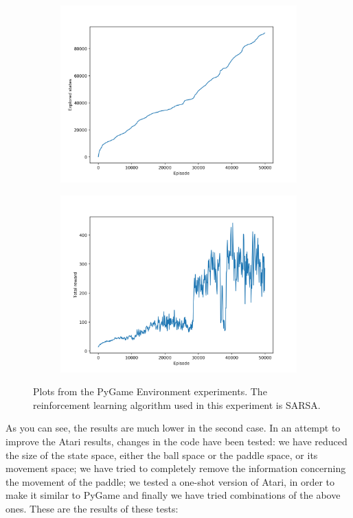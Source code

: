 \begin{figure}
\begin{subfigure}[h]{0.5\linewidth}
\includegraphics[width=\linewidth]{images/pygame-explored-states.png}
\end{subfigure}
\hfill
\begin{subfigure}[h]{0.5\linewidth}
\includegraphics[width=\linewidth]{images/pygame-total-reward.png}
\end{subfigure}
\caption{Plots from the PyGame Environment experiments. The reinforcement learning algorithm used in this experiment is SARSA.}
\end{figure}

As you can see, the results are much lower in the second case. In an attempt to improve the Atari results, changes in the code have been tested: we have reduced the size of the state space, either the ball space or the paddle space, or its movement space; we have tried to completely remove the information concerning the movement of the paddle; we tested a one-shot version of Atari, in order to make it similar to PyGame and finally we have tried combinations of the above ones. These are the results of these tests:

